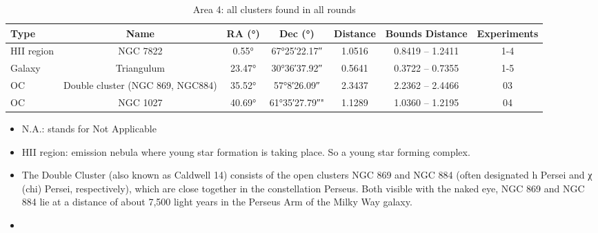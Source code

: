 \begin{table}[H]
    \centering
    \caption{Area 4: all clusters found in all rounds}
    \label{tb:results-raw-a4}
    \begin{tabular}{l c c c c c c}
        \toprule
        Type       & Name                             & RA (°)      & Dec (°)             & Distance & Bounds Distance  & Experiments \\
        \midrule
        HII region & NGC 7822                         & \ang{0.55}  & \ang{+67;25;22.17}  & 1.0516   & 0.8419 -- 1.2411 & 1-4         \\ %
        Galaxy     & Triangulum                       & \ang{23.47} & \ang{+30;36;37.92}  & 0.5641   & 0.3722 -- 0.7355 & 1-5         \\ %
        OC         & Double cluster (NGC 869, NGC884) & \ang{35.52} & \ang{+57;8;26.09}   & 2.3437   & 2.2362 -- 2.4466 & 03          \\ %
        OC         & NGC 1027                         & \ang{40.69} & \ang{+61;35;27.79}" & 1.1289   & 1.0360 -- 1.2195 & 04          \\ %
        \bottomrule
    \end{tabular}
\end{table}

\begin{itemize}
    \item N.A.: stands for Not Applicable
    \item HII region: emission nebula where young star formation is taking place. So a young star forming complex.
    \item The Double Cluster (also known as Caldwell 14) consists of the open clusters NGC 869 and NGC 884 (often designated h Persei and χ (chi) Persei, respectively), which are close together in the constellation Perseus. Both visible with the naked eye, NGC 869 and NGC 884 lie at a distance of about 7,500 light years in the Perseus Arm of the Milky Way galaxy.
    \item {}
\end{itemize}
